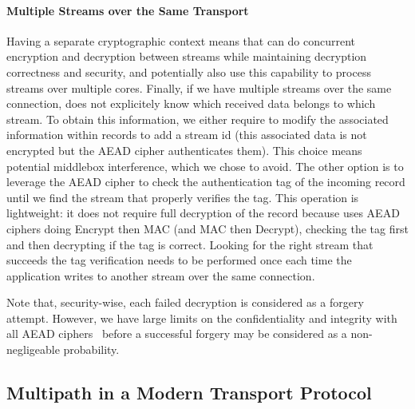 \paragraph*{Multiple Streams over the Same Transport}
Having a separate cryptographic context means that \tcpls can do concurrent
encryption and decryption between streams while maintaining decryption
correctness and security, and potentially also use this capability to process
streams over multiple cores. Finally, if we have multiple streams over the same
\tcp connection, \tcpls does not explicitely know which received data belongs to
which stream. To obtain this information, we either require to modify the
associated information within \tls records to add a stream id (this associated
data is not encrypted but the AEAD cipher authenticates them). This choice
means potential middlebox interference, which we chose to avoid. The other
option is to leverage the AEAD cipher to check the authentication tag of the
incoming record until we find the stream that properly verifies the tag. This
operation is lightweight: it does not require full decryption of the record
because  uses AEAD ciphers doing Encrypt then MAC (and MAC then
Decrypt), checking the tag first and then decrypting if the tag is correct.
Looking for the right stream that succeeds the tag verification needs to be
performed once each time the application writes to another stream over the same
\tcp connection.

Note that, security-wise, each failed decryption is considered as a
forgery attempt. However, we have large limits on the confidentiality and
integrity with all AEAD ciphers~\cite{luykx2015limits, aeadlimits} before a
successful forgery may be considered as a non-negligeable probability.



\subsection{Multipath in a Modern Transport Protocol}
\label{sec:multipath}

